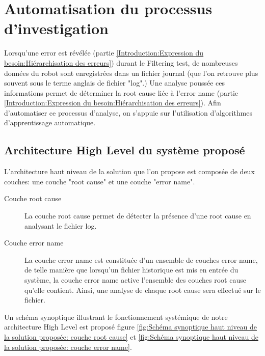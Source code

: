 \chapter{Automatisation du processus d'investigation}
\label{Automatisation du processus d'investigation}
\thispagestyle{fancy}
Lorsqu'une error est révélée (partie \ref{Introduction:Expression du besoin:Hiérarchisation des erreurs}) durant le Filtering test, de nombreuses données du robot sont enregistrées dans un fichier journal (que l'on retrouve plus souvent sous le terme anglais de fichier "log".) Une analyse poussée ces informations permet de déterminer la root cause liée à l'error name (partie \ref{Introduction:Expression du besoin:Hiérarchisation des erreurs}). Afin d'automatiser ce processus d'analyse, on s'appuie sur l'utilisation d'algorithmes d'apprentissage automatique. 

\section{Architecture High Level du système proposé}
\label{Automatisation du processus d'investigation: Achitecture High Level du système proposé}
L'architecture haut niveau de la solution que l'on propose est composée de deux couches: une couche "root cause" et une couche "error name".
\begin{description}
	\item [Couche root cause] La couche root cause permet de détecter la présence d'une root cause en analysant le fichier log.
	\item [Couche error name] La couche error name est constituée d'un ensemble de couches error name, de telle manière que lorsqu'un fichier historique est mis en entrée du système, la couche error name active l'ensemble des couches root cause qu'elle contient. Ainsi, une analyse de chaque root cause sera effectué sur le fichier.
\end{description} 

Un schéma synoptique illustrant le fonctionnement systémique de notre architecture High Level est proposé figure \ref{fig:Schéma synoptique haut niveau de la solution proposée: couche root cause} et \ref{fig:Schéma synoptique haut niveau de la solution proposée: couche error name}.

